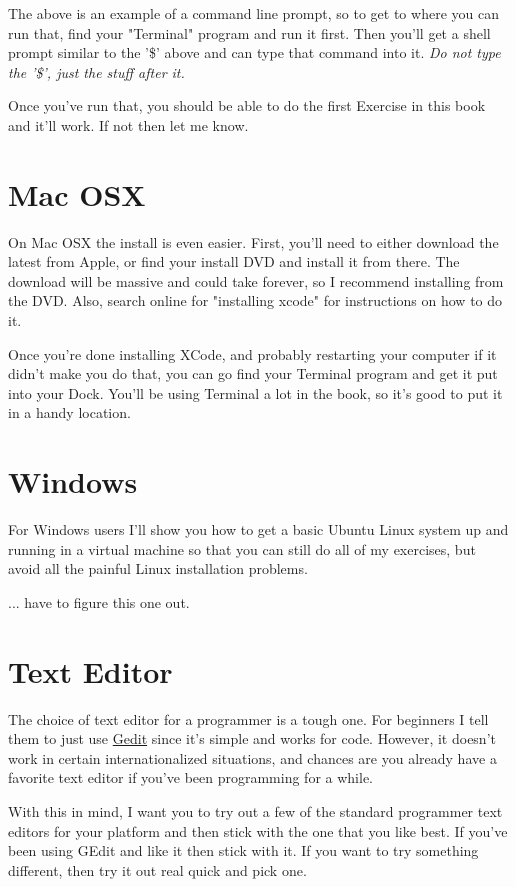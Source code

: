 The above is an example of a command line prompt, so to get to where
you can run that, find your "Terminal" program and run it first.  Then
you'll get a shell prompt similar to the '\$' above and can type that
command into it.  \emph{Do not type the '\$', just the stuff after it.}

Once you've run that, you should be able to do the first Exercise in
this book and it'll work.  If not then let me know.


\section{Mac OSX}

On Mac OSX the install is even easier.  First, you'll need to either 
download the latest  from Apple, or find your install
DVD and install it from there.  The download will be massive and could
take forever, so I recommend installing from the DVD.  Also, search
online for "installing xcode" for instructions on how to do it.

Once you're done installing XCode, and probably restarting your computer
if it didn't make you do that, you can go find your Terminal program
and get it put into your Dock.  You'll be using Terminal a lot in
the book, so it's good to put it in a handy location.


\section{Windows}

For Windows users I'll show you how to get a basic Ubuntu Linux system up and
running in a virtual machine so that you can still do all of my exercises, but
avoid all the painful Linux installation problems.

... have to figure this one out.


\section{Text Editor}

The choice of text editor for a programmer is a tough one.  For beginners
I tell them to just use \href{http://projects.gnome.org/gedit/}{Gedit} since
it's simple and works for code.  However, it doesn't work in certain
internationalized situations, and chances are you already have a favorite
text editor if you've been programming for a while.

With this in mind, I want you to try out a few of the standard programmer
text editors for your platform and then stick with the one that you like
best.  If you've been using GEdit and like it then stick with it.  If you
want to try something different, then try it out real quick and pick one.

